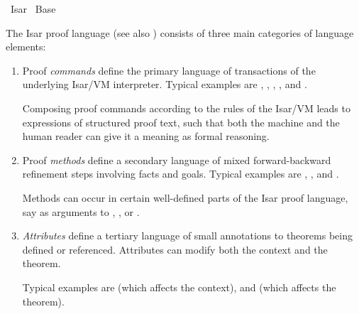 %
\begin{isabellebody}%
\def\isabellecontext{Isar}%
%
\isadelimtheory
%
\endisadelimtheory
%
\isatagtheory
{}\isamarkupfalse%
\ Isar\isanewline
{}\ Base\isanewline
{}%
\endisatagtheory
{\isafoldtheory}%
%
\isadelimtheory
%
\endisadelimtheory
%
\isamarkuptrue%
%
\begin{isamarkuptext}%
The Isar proof language (see also \cite[\S2]{isabelle-isar-ref})
  consists of three main categories of language elements:

  \begin{enumerate}

  \item Proof \emph{commands} define the primary language of
  transactions of the underlying Isar/VM interpreter.  Typical
  examples are \hyperlink{command.fix}{\mbox{}}, \hyperlink{command.assume}{\mbox{}}, \hyperlink{command.show}{\mbox{}}, \hyperlink{command.proof}{\mbox{}}, and \hyperlink{command.qed}{\mbox{}}.

  Composing proof commands according to the rules of the Isar/VM leads
  to expressions of structured proof text, such that both the machine
  and the human reader can give it a meaning as formal reasoning.

  \item Proof \emph{methods} define a secondary language of mixed
  forward-backward refinement steps involving facts and goals.
  Typical examples are \hyperlink{method.rule}{\mbox{}}, \hyperlink{method.unfold}{\mbox{}}, and \hyperlink{method.simp}{\mbox{}}.

  Methods can occur in certain well-defined parts of the Isar proof
  language, say as arguments to \hyperlink{command.proof}{\mbox{}}, \hyperlink{command.qed}{\mbox{}},
  or \hyperlink{command.by}{\mbox{}}.

  \item \emph{Attributes} define a tertiary language of small
  annotations to theorems being defined or referenced.  Attributes can
  modify both the context and the theorem.

  Typical examples are \hyperlink{attribute.intro}{\mbox{}} (which affects the context),
  and \hyperlink{attribute.symmetric}{\mbox{}} (which affects the theorem).


\end{enumerate}
\end{isamarkuptext}
\end{isabellebody}
